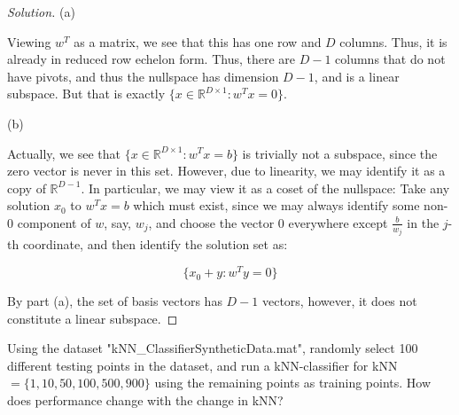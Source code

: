 \documentclass[10pt]{article}
\newenvironment{problem}[2][]{\begin{trivlist}
\item[\hskip \labelsep {\bfseries #1}\hskip \labelsep {\bfseries #2.}]}{\end{trivlist}}
\begin{document}
\begin{proof}[Solution]

(a)

Viewing $w^T$ as a matrix, we see that this has one row and $D$ columns. Thus, it is already in reduced row echelon form. Thus, there are $D-1$ columns that do not have pivots, and thus the nullspace has dimension $D-1$, and is a linear subspace. But that is exactly $\{ x \in \mathbb{R}^{D \times 1} : w^T x = 0 \}$.

(b)

Actually, we see that  $\{ x \in \mathbb{R}^{D \times 1} : w^T x = b \}$ is trivially not a subspace, since the zero vector is never in this set. However, due to linearity, we may identify it as a copy of $\mathbb{R}^{D-1}$. In particular, we may view it as a coset of the nullspace: Take any solution $x_0$ to $w^Tx = b$ which must exist, since we may always identify some non-0 component of $w$, say, $w_j$, and choose the vector 0 everywhere except $\frac{b}{w_j}$ in the $j$-th coordinate, and then identify the solution set as:

$$\{  x_0 + y : w^T y = 0 \}$$

By part (a), the set of basis vectors has $D-1$ vectors, however, it does not constitute a linear subspace.



\end{proof}

\begin{problem}{Question 3}

Using the dataset "kNN\_ClassifierSyntheticData.mat", randomly select 100 different testing points in the dataset, and run a kNN-classifier for kNN $= \{ 1,10,50,100,500,900 \}$ using the remaining points as training points. How does performance change with the change in kNN?

\end{problem}
\end{document}

